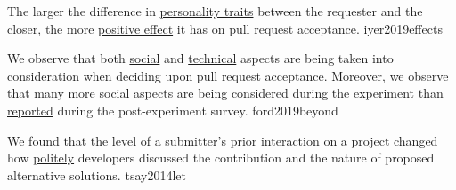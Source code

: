 \documentclass{article}
\begin{document}
  {The larger the difference in \ul{personality traits} between the requester and the closer, the more \ul{positive effect} it has on pull request acceptance.}
  {iyer2019effects}

  {We observe that both \ul{social} and \ul{technical} aspects are being taken into consideration when deciding upon pull request acceptance. Moreover, we observe that many \ul{more} social aspects are being considered during the experiment than \ul{reported} during the post-experiment survey.}
  {ford2019beyond}


  {We found that the level of a submitter's prior interaction on a project changed how \ul{politely} developers discussed the contribution and the nature of proposed alternative solutions.}
  {tsay2014let}

\end{document}
